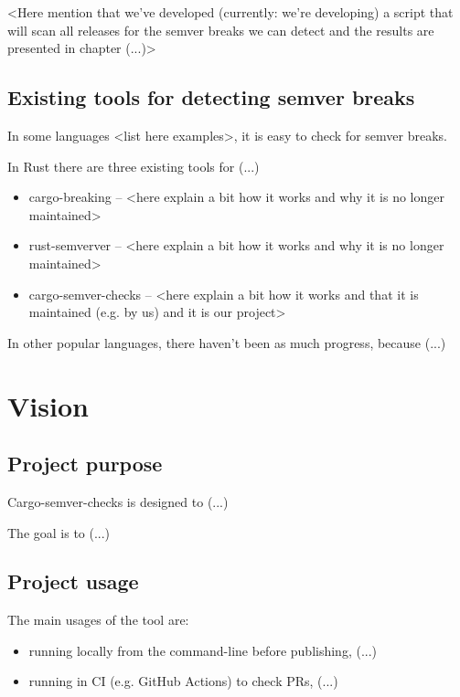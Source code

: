 \documentclass[licencjacka,en]{pracamgr}
\begin{document}
<Here mention that we've developed (currently: we're developing)
a script that will scan all releases for the semver breaks
we can detect and the results are presented in chapter (...)>


\section{Existing tools for detecting semver breaks}

In some languages <list here examples>, it is easy to check for semver breaks.

In Rust there are three existing tools for (...)
\begin{itemize}
	\item cargo-breaking -- <here explain a bit how it works and why it is no longer maintained>
	\item rust-semverver -- <here explain a bit how it works and why it is no longer maintained>
	\item cargo-semver-checks -- <here explain a bit how it works and that it is maintained (e.g. by us) and it is our project>
\end{itemize}

In other popular languages, there haven't been as much progress, because (...)




\chapter{Vision}\label{r:vision}

\section{Project purpose}

Cargo-semver-checks is designed to (...)

The goal is to (...)


\section{Project usage}

The main usages of the tool are:
\begin{itemize}
	\item running locally from the command-line before publishing, (...)
	\item running in CI (e.g. GitHub Actions) to check PRs, (...)
\end{itemize}
\end{document}
